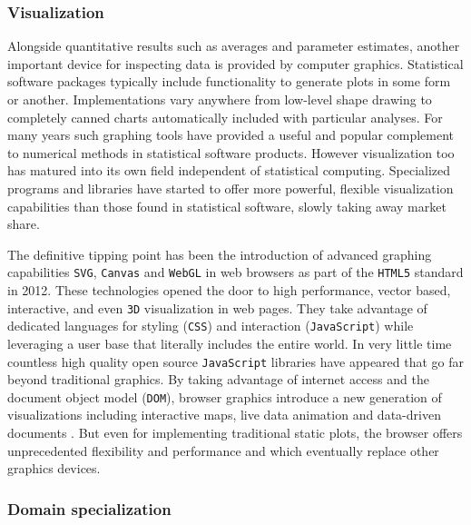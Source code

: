 \subsubsection{Visualization}

Alongside quantitative results such as averages and parameter estimates, another important device for inspecting data is provided by computer graphics. Statistical software packages typically include functionality to generate plots in some form or another. Implementations vary anywhere from low-level shape drawing to completely canned charts automatically included with particular analyses. For many years such graphing tools have provided a useful and popular complement to numerical methods in statistical software products. However visualization too has matured into its own field independent of statistical computing. Specialized programs and libraries have started to offer more powerful, flexible visualization capabilities than those found in statistical software, slowly taking away market share. 

The definitive tipping point has been the introduction of advanced graphing capabilities \texttt{SVG}, \texttt{Canvas} and \texttt{WebGL} in web browsers as part of the \texttt{HTML5} standard in 2012. These technologies opened the door to high performance, vector based, interactive, and even \texttt{3D} visualization in web pages. They take advantage of dedicated languages for styling (\texttt{CSS}) and interaction (\texttt{JavaScript}) while leveraging a user base that literally includes the entire world. In very little time countless high quality open source \texttt{JavaScript} libraries have appeared that go far beyond traditional graphics. By taking advantage of internet access and the document object model (\texttt{DOM}), browser graphics introduce a new generation of visualizations including interactive maps, live data animation and data-driven documents \citep{bostock2011d3}. But even for implementing traditional static plots, the browser offers unprecedented flexibility and performance and which eventually replace other graphics devices.

\subsubsection{Domain specialization}

